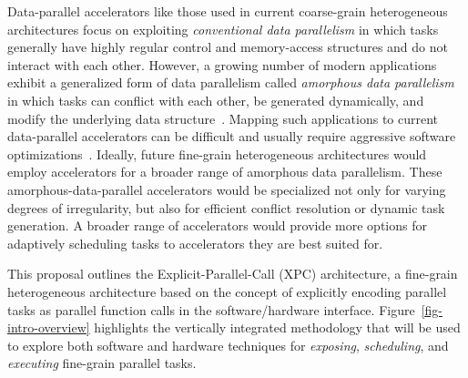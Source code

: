Data-parallel accelerators like those used in current coarse-grain
heterogeneous architectures focus on exploiting \emph{conventional data
  parallelism} in which tasks generally have highly regular control and
memory-access structures and do not interact with each other.  However, a
growing number of modern applications exhibit a generalized form of data
parallelism called \emph{amorphous data parallelism} in which tasks can
conflict with each other, be generated dynamically, and modify the
underlying data structure~\cite{pingali-tao-pldi2011}. Mapping such
applications to current data-parallel accelerators can be difficult and
usually require aggressive software
optimizations~\cite{luo-gpu-bfs-dac2010,harish-large-graph-gpu-hipc2007,
  hong-cuda-max-warp-ppopp2011,nasre-data-vs-topo-ipdps2013,
  nasre-morph-ppopp2013,mendez-optimizations-amorphous-ppopp2010,
  mendez-gpu-pta-ppopp2012}. Ideally, future fine-grain heterogeneous
architectures would employ accelerators for a broader range of amorphous
data parallelism. These amorphous-data-parallel accelerators would be
specialized not only for varying degrees of irregularity, but also for
efficient conflict resolution or dynamic task generation. A broader range
of accelerators would provide more options for adaptively scheduling
tasks to accelerators they are best suited for.

This proposal outlines the Explicit-Parallel-Call (XPC) architecture, a
fine-grain heterogeneous architecture based on the concept of explicitly
encoding parallel tasks as parallel function calls in the software/hardware
interface. Figure~\ref{fig-intro-overview} highlights the vertically
integrated methodology that will be used to explore both software and
hardware techniques for \emph{exposing}, \emph{scheduling}, and
\emph{executing} fine-grain parallel tasks.
